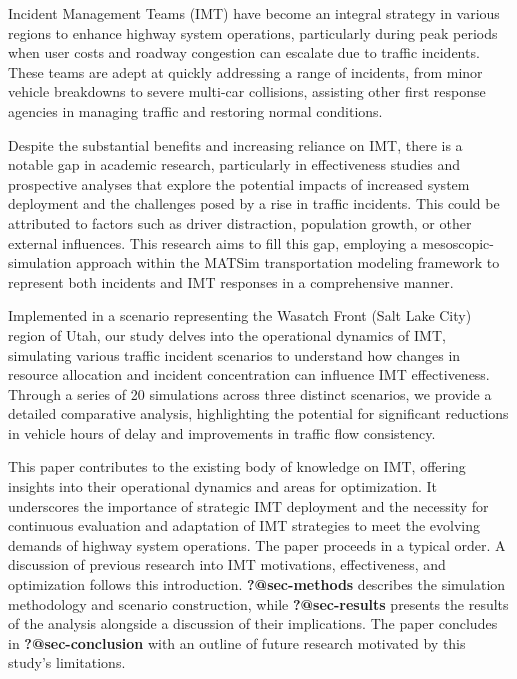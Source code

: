 \documentclass[
  letterpaper,
  authoryear]{elsarticle}
\begin{document}
Incident Management Teams (IMT) have become an integral strategy in
various regions to enhance highway system operations, particularly
during peak periods when user costs and roadway congestion can escalate
due to traffic incidents. These teams are adept at quickly addressing a
range of incidents, from minor vehicle breakdowns to severe multi-car
collisions, assisting other first response agencies in managing traffic
and restoring normal conditions.

Despite the substantial benefits and increasing reliance on IMT, there
is a notable gap in academic research, particularly in effectiveness
studies and prospective analyses that explore the potential impacts of
increased system deployment and the challenges posed by a rise in
traffic incidents. This could be attributed to factors such as driver
distraction, population growth, or other external influences. This
research aims to fill this gap, employing a mesoscopic-simulation
approach within the MATSim transportation modeling framework to
represent both incidents and IMT responses in a comprehensive manner.

Implemented in a scenario representing the Wasatch Front (Salt Lake
City) region of Utah, our study delves into the operational dynamics of
IMT, simulating various traffic incident scenarios to understand how
changes in resource allocation and incident concentration can influence
IMT effectiveness. Through a series of 20 simulations across three
distinct scenarios, we provide a detailed comparative analysis,
highlighting the potential for significant reductions in vehicle hours
of delay and improvements in traffic flow consistency.

This paper contributes to the existing body of knowledge on IMT,
offering insights into their operational dynamics and areas for
optimization. It underscores the importance of strategic IMT deployment
and the necessity for continuous evaluation and adaptation of IMT
strategies to meet the evolving demands of highway system operations.
The paper proceeds in a typical order. A discussion of previous research
into IMT motivations, effectiveness, and optimization follows this
introduction. \textbf{?@sec-methods} describes the simulation
methodology and scenario construction, while \textbf{?@sec-results}
presents the results of the analysis alongside a discussion of their
implications. The paper concludes in \textbf{?@sec-conclusion} with an
outline of future research motivated by this study's limitations.

\end{document}
